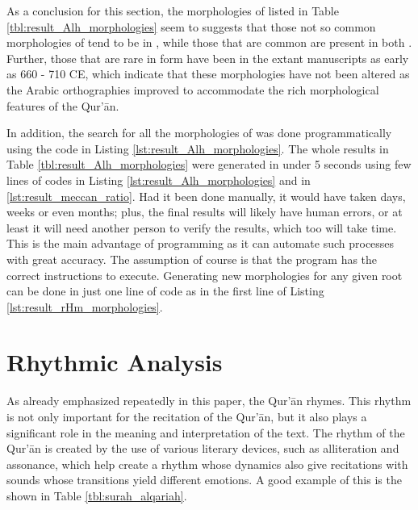 As a conclusion for this section, the morphologies of   listed in Table \ref{tbl:result_Alh_morphologies} seem to suggests that those not so common morphologies of   tend to be in  , while those that are common are present in both  . Further, those that are rare in form have been in the extant manuscripts as early as 660 - 710 CE, which indicate that these morphologies have not been altered as the Arabic orthographies improved to accommodate the rich morphological features of the Qur'\=an. 

In addition, the search for all the morphologies of   was done programmatically using the code in Listing \ref{lst:result_Alh_morphologies}. The whole results in Table \ref{tbl:result_Alh_morphologies} were generated in under 5 seconds using few lines of codes in Listing \ref{lst:result_Alh_morphologies} and in \ref{lst:result_meccan_ratio}. Had it been done manually, it would have taken days, weeks or even months; plus, the final results will likely have human errors, or at least it will need another person to verify the results, which too will take time. This is the main advantage of programming as it can automate such processes with great accuracy. The assumption of course is that the program has the correct instructions to execute. Generating new morphologies for any given root can be done in just one line of code as in the first line of Listing \ref{lst:result_rHm_morphologies}.


\section{Rhythmic Analysis}\label{sec:result_rhythmic_analysis}
As already emphasized repeatedly in this paper, the Qur'\=an rhymes. This rhythm is not only important for the recitation of the Qur'\=an, but it also plays a significant role in the meaning and interpretation of the text. The rhythm of the Qur'\=an is created by the use of various literary devices, such as alliteration and assonance, which help create a rhythm whose dynamics also give recitations with sounds whose transitions yield different emotions. A good example of this is the   shown in Table \ref{tbl:surah_alqariah}.

